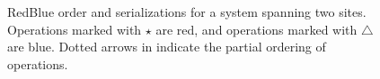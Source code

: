 \documentclass[11pt,dvipdfm]{article}
\begin{document}
\begin{figure}[t!]
\centering
 \begin{minipage}[t]{0.45\columnwidth}
\centering
{}
\end{minipage}
\hfill
 \begin{minipage}[t]{0.45\columnwidth}
\centering
{}
\end{minipage}
\caption{RedBlue order and serializations for a system spanning two
  sites. Operations marked with {\Large $\star$} are red, and
  operations marked with $\bigtriangleup$ are blue. Dotted arrows in \protect{} indicate the partial ordering of
operations. }
\label{fig:expositoryfigure}
\end{figure}
\end{document}
